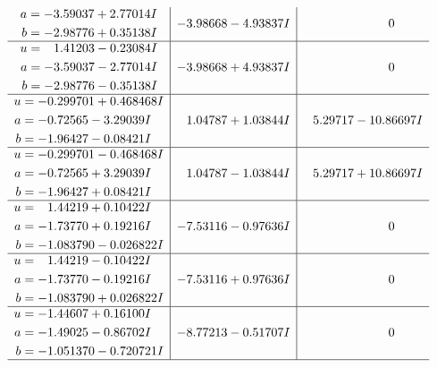 \documentclass[1p]{elsarticle_modified}
\theoremstyle{definition}
\begin{document}
$$\begin{array}{c|c|c}
\begin{aligned}
a &= -3.59037 + 2.77014 I \\
b &= -2.98776 + 0.35138 I\end{aligned}
 & -3.98668 - 4.93837 I & \phantom{-0.000000 } 0 \\ \hline\begin{aligned}
u &= \phantom{-}1.41203 - 0.23084 I \\
a &= -3.59037 - 2.77014 I \\
b &= -2.98776 - 0.35138 I\end{aligned}
 & -3.98668 + 4.93837 I & \phantom{-0.000000 } 0 \\ \hline\begin{aligned}
u &= -0.299701 + 0.468468 I \\
a &= -0.72565 - 3.29039 I \\
b &= -1.96427 - 0.08421 I\end{aligned}
 & \phantom{-}1.04787 + 1.03844 I & \phantom{-}5.29717 - 10.86697 I \\ \hline\begin{aligned}
u &= -0.299701 - 0.468468 I \\
a &= -0.72565 + 3.29039 I \\
b &= -1.96427 + 0.08421 I\end{aligned}
 & \phantom{-}1.04787 - 1.03844 I & \phantom{-}5.29717 + 10.86697 I \\ \hline\begin{aligned}
u &= \phantom{-}1.44219 + 0.10422 I \\
a &= -1.73770 + 0.19216 I \\
b &= -1.083790 - 0.026822 I\end{aligned}
 & -7.53116 - 0.97636 I & \phantom{-0.000000 } 0 \\ \hline\begin{aligned}
u &= \phantom{-}1.44219 - 0.10422 I \\
a &= -1.73770 - 0.19216 I \\
b &= -1.083790 + 0.026822 I\end{aligned}
 & -7.53116 + 0.97636 I & \phantom{-0.000000 } 0 \\ \hline\begin{aligned}
u &= -1.44607 + 0.16100 I \\
a &= -1.49025 - 0.86702 I \\
b &= -1.051370 - 0.720721 I\end{aligned}
 & -8.77213 - 0.51707 I & \phantom{-0.000000 } 0\\
 \hline 
 \end{array}$$\newpage$$\begin{array}{c|c|c}  

\end{array}$$
\end{document}
